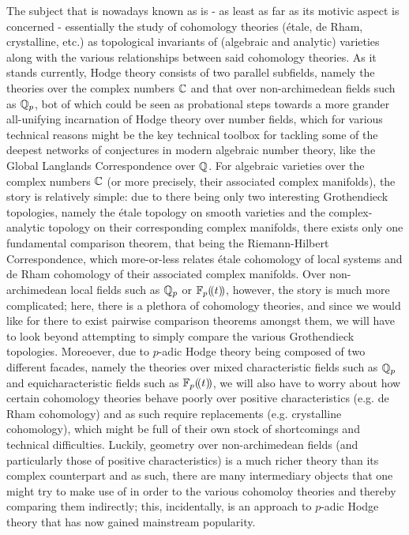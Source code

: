             The subject that is nowadays known as  is - as least as far as its motivic aspect is concerned - essentially the study of cohomology theories (\'etale, de Rham, crystalline, etc.) as topological invariants of (algebraic and analytic) varieties along with the various relationships between said cohomology theories. As it stands currently, Hodge theory consists of two parallel subfields, namely the theories over the complex numbers $\mathbb{C}$ and that over non-archimedean fields such as $\mathbb{Q}_p$, bot of which could be seen as probational steps towards a more grander all-unifying incarnation of Hodge theory over number fields, which for various technical reasons might be the key technical toolbox for tackling some of the deepest networks of conjectures in modern algebraic number theory, like the Global Langlands Correspondence over $\mathbb{Q}$. For algebraic varieties over the complex numbers $\mathbb{C}$ (or more precisely, their associated complex manifolds), the story is relatively simple: due to there being only two interesting Grothendieck topologies, namely the \'etale topology on smooth varieties and the complex-analytic topology on their corresponding complex manifolds, there exists only one fundamental comparison theorem, that being the Riemann-Hilbert Correspondence, which more-or-less relates \'etale cohomology of local systems and de Rham cohomology of their associated complex manifolds. Over non-archimedean local fields such as $\mathbb{Q}_p$ or $\mathbb{F}_p(\!(t)\!)$, however, the story is much more complicated; here, there is a plethora of cohomology theories, and since we would like for there to exist pairwise comparison theorems amongst them, we will have to look beyond attempting to simply compare the various Grothendieck topologies. Moreoever, due to $p$-adic Hodge theory being composed of two different facades, namely the theories over mixed characteristic fields such as $\mathbb{Q}_p$ and equicharacteristic fields such as $\mathbb{F}_p(\!(t)\!)$, we will also have to worry about how certain cohomology theories behave poorly over positive characteristics (e.g. de Rham cohomology) and as such require replacements (e.g. crystalline cohomology), which might be full of their own stock of shortcomings and technical difficulties. Luckily, geometry over non-archimedean fields (and particularly those of positive characteristics) is a much richer theory than its complex counterpart and as such, there are many intermediary objects that one might try to make use of in order to  the various cohomoloy theories and thereby comparing them indirectly; this, incidentally, is an approach to $p$-adic Hodge theory that has now gained mainstream popularity.
    

